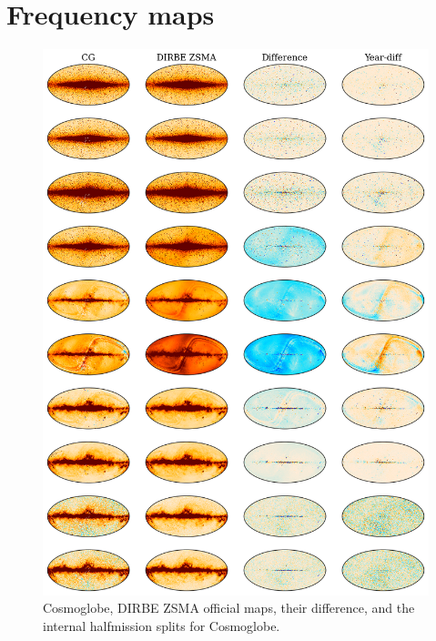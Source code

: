 \documentclass{aa}
\begin{document}
\section{Frequency maps}
\begin{figure}
	\centering
	\includegraphics[width=\linewidth]{figs/diff_grid.png}
	\caption{Cosmoglobe, DIRBE ZSMA official maps, their difference, and the internal halfmission splits for Cosmoglobe.}
	\label{fig:diff_grid}
\end{figure}
\end{document}
